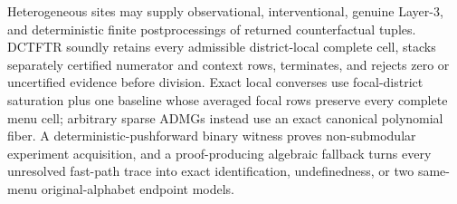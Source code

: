 Heterogeneous sites may supply observational, interventional, genuine Layer-3, and deterministic finite postprocessings of returned counterfactual tuples.  DCTFTR soundly retains every admissible district-local complete cell, stacks separately certified numerator and context rows, terminates, and rejects zero or uncertified evidence before division.  Exact local converses use focal-district saturation plus one baseline whose averaged focal rows preserve every complete menu cell; arbitrary sparse ADMGs instead use an exact canonical polynomial fiber.  A deterministic-pushforward binary witness proves non-submodular experiment acquisition, and a proof-producing algebraic fallback turns every unresolved fast-path trace into exact identification, undefinedness, or two same-menu original-alphabet endpoint models.